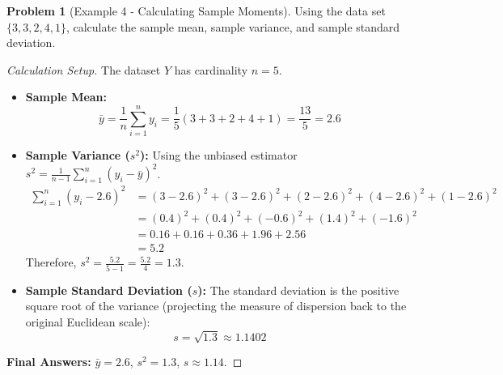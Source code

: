 \documentclass[11pt]{article}
\theoremstyle{definition}
\newtheorem{problem}{Problem}
\theoremstyle{remark}
\newcommand{\samplemean}{\bar{y}}
\begin{document}
\begin{problem}[Example 4 - Calculating Sample Moments]
Using the data set $\{3, 3, 2, 4, 1\}$, calculate the sample mean, sample variance, and sample standard deviation.
\end{problem}
\begin{proof}[Calculation Setup]
The dataset $Y$ has cardinality $n = 5$.
\begin{itemize}
    \item \textbf{Sample Mean:} 
    \[ \samplemean = \frac{1}{n}\sum_{i=1}^n y_i = \frac{1}{5}(3 + 3 + 2 + 4 + 1) = \frac{13}{5} = 2.6 \]
    \item \textbf{Sample Variance ($s^2$):} 
    Using the unbiased estimator $s^2 = \frac{1}{n-1} \sum_{i=1}^n (y_i - \samplemean)^2$.
    \begin{align*}
        \sum_{i=1}^n (y_i - 2.6)^2 &= (3 - 2.6)^2 + (3 - 2.6)^2 + (2 - 2.6)^2 + (4 - 2.6)^2 + (1 - 2.6)^2 \\
        &= (0.4)^2 + (0.4)^2 + (-0.6)^2 + (1.4)^2 + (-1.6)^2 \\
        &= 0.16 + 0.16 + 0.36 + 1.96 + 2.56 \\
        &= 5.2
    \end{align*}
    Therefore, $s^2 = \frac{5.2}{5-1} = \frac{5.2}{4} = 1.3$.
    \item \textbf{Sample Standard Deviation ($s$):}
    The standard deviation is the positive square root of the variance (projecting the measure of dispersion back to the original Euclidean scale):
    \[ s = \sqrt{1.3} \approx 1.1402 \]
\end{itemize}
\textbf{Final Answers:} $\samplemean = 2.6$, $s^2 = 1.3$, $s \approx 1.14$.
\end{proof}
\end{document}

